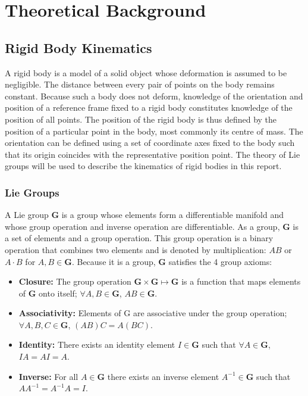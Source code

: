 \chapter{Theoretical Background}\label{chap:background}

\section{Rigid Body Kinematics}
	A rigid body is a model of a solid object whose deformation is assumed to be negligible. The distance between every pair of points on the body remains constant. Because such a body does not deform, knowledge of the orientation and position of a reference frame fixed to a rigid body constitutes knowledge of the position of all points. The position of the rigid body is thus defined by the position of a particular point in the body, most commonly its centre of mass. The orientation can be defined using a set of coordinate axes fixed to the body such that its origin coincides with the representative position point.
	The theory of Lie groups will be used to describe the kinematics of rigid bodies in this report.
			
	\subsection{Lie Groups}		
		A Lie group $\mathbf{G}$ is a group whose elements form a differentiable manifold and whose group operation and inverse operation are differentiable.
		As a group, $\mathbf{G}$ is a set of elements and a group operation. This group operation is a binary operation that combines two elements and is denoted by multiplication: $AB$ or $A \cdot B$ for $A,B \in \mathbf{G}$. Because it is a group, $\mathbf{G}$ satisfies the 4 group axioms:
		\begin{itemize}
		\item \textbf{Closure:} 
			The group operation
			$\mathbf{G} \times \mathbf{G} \mapsto \mathbf{G}$ 
			is a function that maps elements of $\mathbf{G}$ onto itself;
			$\forall A,B \in \mathbf{G}$, $AB \in \mathbf{G}$.
		\item \textbf{Associativity:} Elements of G are associative under the group operation;
			$\forall A,B,C \in \mathbf{G}$, $(AB)C=A(BC)$.
		\item \textbf{Identity:} There exists an identity element $I \in \mathbf{G}$  such that
			$\forall A \in \mathbf{G}$, $IA = AI = A$.
		\item \textbf{Inverse:} For all $A \in \mathbf{G}$ there exists an inverse element $A^{-1} \in \mathbf{G}$ such that $AA^{-1}=A^{-1}A=I$. 
		\end{itemize}
		
